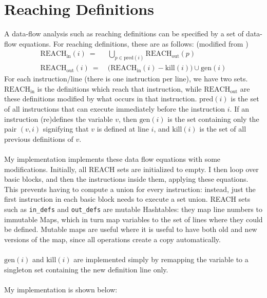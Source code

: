 \documentclass[12pt,notitlepage]{report}
\newcommand{\camlinline}{\texttt}
\begin{document}
\section{Reaching Definitions}
\label{sample:reach}
A data-flow analysis such as reaching definitions can be specified by a set of data-flow equations. For reaching definitions, these are as follows: (modified from \cite{Reaching_defs} )
\begin{align*}
\text{REACH}_{\text{in}} (i) \ = &\ \bigcup_{p \in \text{pred}(i)} \text{REACH}_\text{out} (p) \\
\text{REACH}_{\text{out}} (i) \ = &\ \big( \text{REACH}_\text{in} (i) - \text{kill}(i) \big) \cup \text{gen}(i) 
\end{align*}
For each instruction/line (there is one instruction per line), we have two sets. $\text{REACH}_\text{in}$ is the definitions which reach that instruction, while $\text{REACH}_\text{out}$ are these definitions modified by what occurs in that instruction. $\text{pred}(i)$ is the set of all instructions that can execute immediately before the instruction $i$. If an instruction (re)defines the variable $v$, then $\text{gen}(i)$ is the set containing only the pair $(v,i)$ signifying that $v$ is defined at line $i$, and $\text{kill}(i)$ is the set of all previous definitions of $v$.
\\\\
My implementation implements these data flow equations with some modifications. Initially, all REACH sets are initialized to empty. I then loop over basic blocks, and then the instructions inside them, applying these equations. This prevents having to compute a union for every instruction: instead, just the first instruction in each basic block needs to execute a set union. REACH sets such as \camlinline{in_defs} and \camlinline{out_defs} are mutable Hashtables: they map line numbers to immutable Maps, which in turn map variables to the set of lines where they could be defined. Mutable maps are useful where it is useful to have both old and new versions of the map, since all operations create a copy automatically.
\\\\
$\text{gen}(i)$ and $\text{kill}(i)$ are implemented simply by remapping the variable to a singleton set containing the new definition line only.
\\\\
My implementation is shown below:
\end{document}
